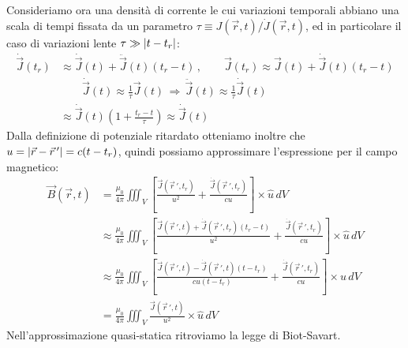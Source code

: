 \documentclass[]{article}
\begin{document}
Consideriamo ora una densità di corrente le cui variazioni temporali abbiano una scala di tempi fissata da un parametro $ \tau \equiv J(\vec{r},t) / \dot{J}(\vec{r},t) $, ed in particolare il caso di variazioni lente $ \tau \gg \left\lvert t - t_r\right\rvert $:
\begin{equation}
	\begin{split}
		\dot{\vec{J}}(t_r) &\approx \dot{\vec{J}}(t) + \ddot{\vec{J}}(t)(t_r - t) \,,\qquad \vec{J}(t_r) \approx \vec{J}(t) + \dot{\vec{J}}(t)(t_r - t) \\ 
				   &\qquad \dot{\vec{J}}(t) \approx \frac{1}{\tau}\vec{J}(t) \,\Rightarrow\, \ddot{\vec{J}}(t) \approx \frac{1}{\tau} \dot{\vec{J}}(t) \\ 
				   &\approx \dot{\vec{J}}(t)\left(1 + \frac{t_r - t}{\tau}\right) \approx \dot{\vec{J}}(t)
	\end{split}
	\label{eq:89}
\end{equation}
Dalla definizione di potenziale ritardato otteniamo inoltre che $ u = \left\lvert\vec{r} - \vec{r}\,'\right\rvert = c (t - t_r) $, quindi possiamo approssimare l'espressione per il campo magnetico:
\begin{equation}
	\begin{split}
		\vec{B}(\vec{r},t) &= \frac{\mu_0}{4\pi} \iiint_V \left[ \frac{\vec{J}(\vec{r}\,', t_r)}{u^2} + \frac{\dot{\vec{J}}(\vec{r}\,', t_r)}{cu} \right] \times \hat{u} \,dV \\ 
				   &\approx \frac{\mu_0}{4\pi} \iiint_V \left[ \frac{\vec{J}(\vec{r}\,', t) + \dot{\vec{J}}(\vec{r}\,',t_r)(t_r - t)}{u^2} + \frac{\dot{\vec{J}}(\vec{r}\,', t_r)}{cu} \right] \times \hat{u} \,dV \\ 
				   &\approx \frac{\mu_0}{4\pi} \iiint_V \left[ \frac{\vec{J}(\vec{r}\,', t) - \dot{\vec{J}}(\vec{r}\,',t)(t - t_r)}{cu (t - t_r)} + \frac{\dot{\vec{J}}(\vec{r}\,', t_r)}{cu} \right] \times \hat{u} \,dV \\ 
				   &= \frac{\mu_0}{4\pi} \iiint_V \frac{\vec{J}(\vec{r}\,', t)}{u^2} \times \hat{u} \,dV
	\end{split}
	\label{eq:90}
\end{equation}
Nell'approssimazione quasi-statica ritroviamo la legge di Biot-Savart.
\end{document}
